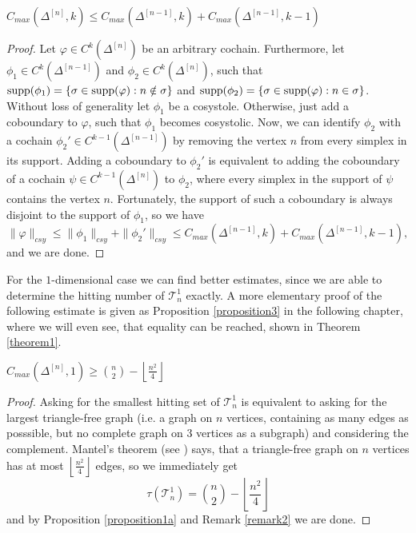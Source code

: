 \begin{prop}\label{proposition232}
\(C_{max}(\Delta^{[n]},k)\leq C_{max}(\Delta^{[n-1]},k)+C_{max}(\Delta^{[n-1]},k-1)\)
\begin{proof}
Let \(\varphi\in C^k(\Delta^{[n]})\) be an arbitrary cochain. Furthermore, let \(\phi_1\in C^k(\Delta^{[n-1]})\) and \(\phi_2\in C^k(\Delta^{[n]})\), such that \(\mathrm{supp}(\phi_1)=\{\sigma\in\mathrm{supp}(\varphi):n\notin\sigma\}\) and \(\mathrm{supp}(\phi_2)=\{\sigma\in\mathrm{supp}(\varphi):n\in\sigma\}\). Without loss of generality let \(\phi_1\) be a cosystole. Otherwise, just add a coboundary to \(\varphi\), such that \(\phi_1\) becomes cosystolic. Now, we can identify \(\phi_2\) with a cochain \(\phi_2'\in C^{k-1}(\Delta^{[n-1]})\) by removing the vertex \(n\) from every simplex in its support. Adding a coboundary to \(\phi_2'\) is equivalent to adding the coboundary of a cochain \(\psi\in C^{k-1}(\Delta^{[n]})\) to \(\phi_2\), where every simplex in the support of \(\psi\) contains the vertex \(n\). Fortunately, the support of such a coboundary is always disjoint to the support of \(\phi_1\), so we have
\[
\|\varphi\|_{csy}\leq\|\phi_1\|_{csy}+\|\phi_2'\|_{csy}\leq C_{max}(\Delta^{[n-1]},k)+C_{max}(\Delta^{[n-1]},k-1),
\]
and we are done.
\end{proof}
\end{prop}

For the \(1\)-dimensional case we can find better estimates, since we are able to determine the hitting number of \(\mathcal{T}_n^1\) exactly. A more elementary proof of the following estimate is given as Proposition \ref{proposition3} in the following chapter, where we will even see, that equality can be reached, shown in Theorem \ref{theorem1}.

\begin{prop}\label{proposition112}
\(C_{max}(\Delta^{[n]},1)\geq\binom{n}{2}-\left\lfloor\frac{n^2}{4}\right\rfloor\)
\begin{proof}
Asking for the smallest hitting set of \(\mathcal{T}_n^1\) is equivalent to asking for the largest triangle-free graph (i.e. a graph on \(n\) vertices, containing as many edges as posssible, but no complete graph on \(3\) vertices as a subgraph) and considering the complement. Mantel's theorem (see \cite{7}) says, that a triangle-free graph on \(n\) vertices has at most \(\left\lfloor\frac{n^2}{4}\right\rfloor\) edges, so we immediately get
\[
\tau(\mathcal{T}_n^1)=\binom{n}{2}-\left\lfloor\frac{n^2}{4}\right\rfloor
\]
and by Proposition \ref{proposition1a} and Remark \ref{remark2} we are done.
\end{proof}
\end{prop}

